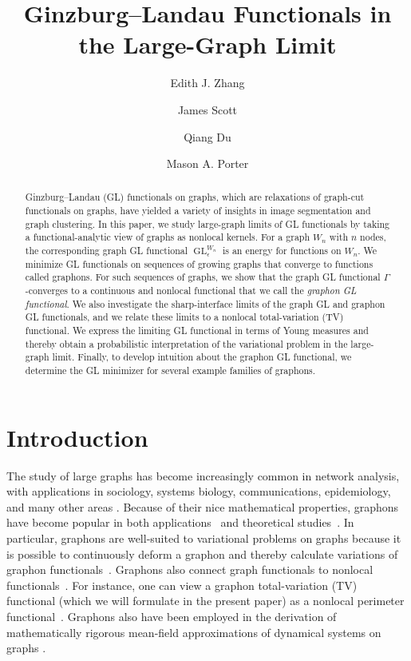 \documentclass[11pt]{amsart}
\title[]{Ginzburg--Landau Functionals in the Large-Graph Limit}
\author[E. J. Zhang]{Edith J. Zhang}
\author[J. Scott]{James Scott}
\author[Q. Du]{Qiang Du}
\author[M. A. Porter]{Mason A. Porter}
\def\ep{\epsilon}
\def\GL{\operatorname{GL}}
\numberwithin{equation}{section}
\begin{document}
\begin{abstract}
Ginzburg--Landau (GL) functionals on graphs, which are relaxations of graph-cut functionals on graphs, have yielded a variety of insights in image segmentation and graph clustering. In this paper, we study large-graph limits of GL functionals by taking a functional-analytic view of graphs as nonlocal kernels. For a graph $W_n$ with $n$ nodes, the corresponding graph GL functional $\GL^{W_n}_\ep$ is an energy for functions on $W_n$. We minimize GL functionals on sequences of growing graphs that converge to functions called graphons. For such sequences of graphs, we show that the graph GL functional $\Gamma$-converges to a continuous and nonlocal functional that we call the \emph{graphon GL functional}. We also investigate the sharp-interface limits of the graph GL and graphon GL functionals, and we relate these limits to a nonlocal total-variation (TV) functional. We express the limiting GL functional in terms of Young measures and thereby obtain a probabilistic interpretation of the variational problem in the large-graph limit. Finally, to develop intuition about the graphon GL functional, we determine the GL minimizer for several example families of graphons.
\end{abstract}

\maketitle


\section{Introduction}

The study of large graphs has become increasingly common in network analysis, with applications {in sociology}, systems biology, communications, {epidemiology}, and many other areas \cite{sinews-graphons}. Because of their nice mathematical properties, graphons have become popular in both applications~\cite{medvedev2014b,parise2019graphon, ruiz2021graphon, gao2019graphon, vizuete2020graphon, wolfe2013nonparametric} and theoretical studies~\cite{borgs2016sparse, borgs2008convergent,braides2020cut,diaconis2007graph,lovasz2012large}. In particular, graphons are well-suited to variational problems on graphs because it is possible to continuously deform a graphon and thereby calculate variations of graphon functionals~\cite[Section 16.2]{lovasz2012large}. Graphons also connect graph functionals to nonlocal functionals~\cite{lou2010image, zhang2010wavelet}. For instance, one can view a graphon total-variation (TV) functional (which we will formulate in the present paper) as a nonlocal perimeter functional~\cite{elbouchairi2023nonlocal, caffarelli2009nonlocal, gilboa2009nonlocal}. Graphons {also have} been employed in the derivation of mathematically rigorous mean-field approximations of dynamical systems on graphs \cite{medvedev2014a,medvedev2014b}.
\end{document}
